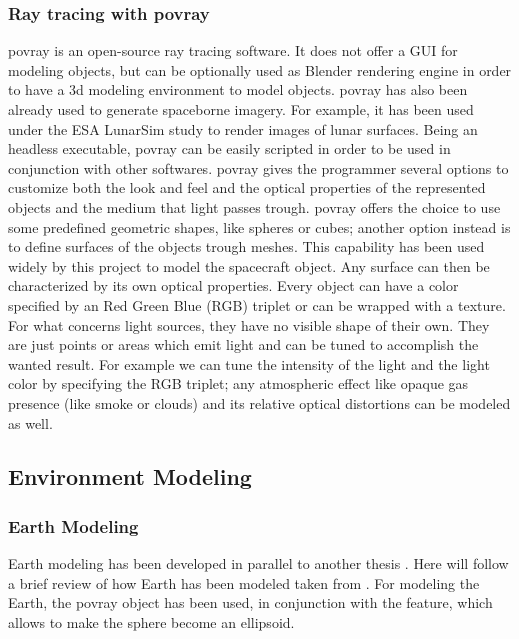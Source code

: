 \subsubsection{Ray tracing with \acrshort{povray}}
\acrshort{povray} is an open-source ray tracing software. It does not offer a GUI for modeling objects, but can be optionally used as Blender rendering engine in order to have a \acrshort{3d} modeling environment to model objects. \acrshort{povray} has also been already used to generate spaceborne imagery. For example, it has been used under the ESA LunarSim study to render images of lunar surfaces. Being an headless executable, \acrshort{povray} can be easily scripted in order to be used in conjunction with other softwares.
\acrshort{povray} gives the programmer several options to customize both the look and feel and the optical properties of the represented objects and the medium that light passes trough. \acrshort{povray} offers the choice to use some predefined geometric shapes, like spheres or cubes; another option instead is to define surfaces of the objects trough meshes. This capability has been used widely by this project to model the spacecraft object.
Any surface can then be characterized by its own optical properties. Every object can have a color specified by an Red Green Blue (RGB) triplet or can be wrapped with a texture.\\
For what concerns light sources, they have no visible shape of their own. They are just points or areas which emit light and can be tuned to accomplish the wanted result. For example we can tune the intensity of the light and the light color by specifying the RGB triplet; any atmospheric effect like opaque gas presence (like smoke or clouds) and its relative optical distortions can be modeled as well.

\subsection{Environment Modeling}
\subsubsection{Earth Modeling}
Earth modeling has been developed in parallel to another thesis \cite{jacopo}.
Here will follow a brief review of how Earth has been modeled taken from \cite{jacopo}.
For modeling the Earth, the \acrshort{povray}  object has been used, in conjunction with the  feature, which allows to make the sphere become an ellipsoid.

